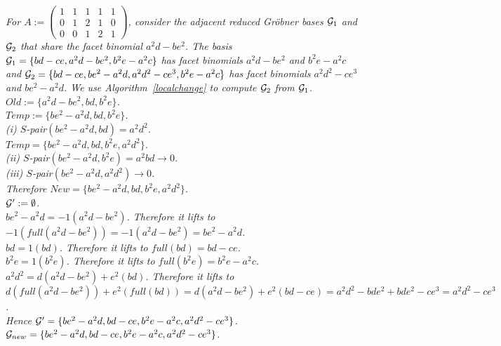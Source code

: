 \documentclass[11pt]{article}
\begin{document}
\begin{example}{\em For 
$A := \left( \begin{array}{cccccc} 1 & 1 & 1 & 1 & 1 \\
                                   0 & 1 & 2 & 1 & 0 \\
                                   0 & 0 & 1 & 2 & 1 \end{array}
\right )$, consider the adjacent reduced Gr\"obner bases ${\cal G}_1$
and ${\cal G}_2$ that share the facet binomial $a^2d-be^2$. 
The basis ${\cal G}_1  = \{ bd-ce, a^2d-be^2, b^2e-a^2c \}$ has facet
binomials $a^2d-be^2$ and $b^2e-a^2c$ and ${\cal G}_2 = 
\{bd-ce, be^2-a^2d, a^2d^2-ce^3, b^2e-a^2c \}$ has facet binomials 
$a^2d^2-ce^3$ and $be^2-a^2d$. We use Algorithm~\ref{localchange} to
compute ${\cal G}_2$ from ${\cal G}_1$.\\

 $Old := \{ a^2d-be^2, bd, b^2e \}$.\\

 $Temp := \{ be^2-a^2d, bd, b^2e \}$.\\

 (i) $S$-pair$(be^2-a^2d,bd) = a^2d^2$.\\
$ Temp = \{ be^2-a^2d, bd, b^2e, a^2d^2 \}$.\\
(ii) $S$-pair$(be^2-a^2d, b^2e) = a^2bd \rightarrow 0$.\\
(iii) $S$-pair$(be^2-a^2d,a^2d^2) \rightarrow 0$.\\
Therefore $New = \{ be^2-a^2d, bd, b^2e, a^2d^2 \}$.\\

 ${\cal G}' := \emptyset$.\\

$be^2-a^2d = -1(a^2d-be^2)$. Therefore it lifts to $-1(full(a^2d-be^2))
= -1(a^2d-be^2) = be^2-a^2d$.\\
$bd = 1(bd)$. Therefore it lifts to $full(bd) = bd-ce$.\\
$b^2e = 1(b^2e)$. Therefore it lifts to $full(b^2e) = b^2e-a^2c$.\\
$a^2d^2 = d(a^2d-be^2) + e^2(bd)$. 
Therefore it lifts to $d(full(a^2d-be^2)) + e^2(full(bd)) = 
d(a^2d-be^2)+e^2(bd-ce) = a^2d^2 - bde^2 + bde^2 - ce^3 = a^2d^2 - ce^3$.\\
Hence ${\cal G}' = \{ be^2-a^2d, bd-ce, b^2e-a^2c, a^2d^2-ce^3\}$.\\

 ${\cal G}_{new} = 
\{ be^2-a^2d, bd-ce, b^2e-a^2c, a^2d^2-ce^3\}$.}
\end{example}
\end{document}
